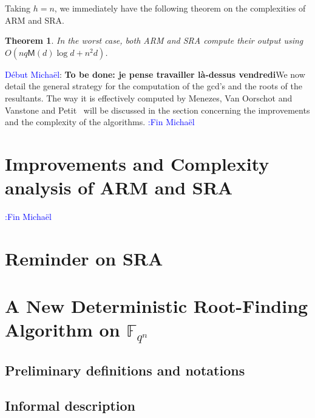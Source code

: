 \documentclass{sig-alternate}
\newcommand{\ff}[1]{\mathbb{F}_{#1}}
\newcommand{\qq}{q}
\newcommand{\nn}{n}
\newcommand{\qn}{{\qq^\nn}}
\newcommand{\extf}{\ff{\qn}}
\newcommand{\Mul}{\mathsf{M}}
\newcounter{algo}
\newcommand{\comd}{\noindent \textcolor{blue}{D\'ebut Micha\"el}:}
\newcommand{\comf}{\noindent \textcolor{blue}{:Fin Micha\"el}}
\newtheorem{Theo}{Theorem}
\begin{document}
 Taking $h=n$, we immediately have the following theorem on the
 complexities of ARM and SRA.

 \begin{Theo}
   In the worst case, both ARM and SRA compute their output using
   $O(nq\Mul(d)\log d + n^2d)$.
 \end{Theo}



\comd
{\bf To be done: je pense travailler l\`a-dessus vendredi}We now detail the general strategy for the computation of the gcd's and the roots of the resultants. The way it is effectively computed by Menezes, Van Oorschot and Vanstone\cite{MOV92} and Petit~\cite{} will be discussed in the section concerning the improvements and the complexity of the algorithms.
\comf



\section{Improvements and Complexity analysis of ARM and SRA}







\comf






\section{Reminder on SRA}

\section{A New Deterministic Root-Finding Algorithm on $\extf$}

\subsection{Preliminary definitions and notations}

\subsection{Informal description}
\end{document}

